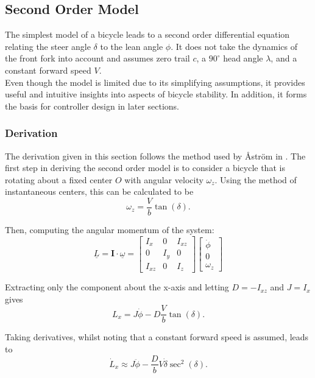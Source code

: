 \subsection{Second Order Model} \label{SecondOrder}
The simplest model of a bicycle leads to a second order differential equation relating the steer angle $\delta$ to the lean angle $\phi$. It does not take the dynamics of the front fork into account and assumes zero trail $c$, a $90^{\circ}$ head angle $\lambda$, and a constant forward speed $V$. \\

Even though the model is limited due to its simplifying assumptions, it provides useful and intuitive insights into aspects of bicycle stability. In addition, it forms the basis for controller design in later sections.

\subsubsection{Derivation}
The derivation given in this section follows the method used by {\AA}str{\"o}m in \cite{astrom}. The first step in deriving the second order model is to consider a bicycle that is rotating about a fixed center $O$ with angular velocity $\omega_z$. Using the method of instantaneous centers, this can be calculated to be
\begin{equation*}
\omega_z = \frac{V}{b} \tan{(\delta)}.
\end{equation*}

Then, computing the angular momentum of the system:
\begin{equation*}
\underline{L} = \mathbf{I} \cdot \underline{\omega} = \begin{bmatrix}
I_x & 0 & I_{xz} \\
0 & I_y & 0 \\
I_{xz} & 0 & I_z
\end{bmatrix} \begin{bmatrix}
\dot{\phi} \\
0 \\
\omega_z
\end{bmatrix}
\end{equation*}

Extracting only the component about the x-axis and letting $D=-I_{xz}$ and $J=I_x$ gives
\begin{equation*}
L_x = J \dot{\phi} - D \frac{V}{b} \tan{(\delta)}.
\end{equation*}

Taking derivatives, whilst noting that a constant forward speed is assumed, leads to
\begin{equation*}
\dot{L}_x \approx J \ddot{\phi} - \frac{D}{b} V \dot{\delta} \sec^2{(\delta)}.
\end{equation*}

